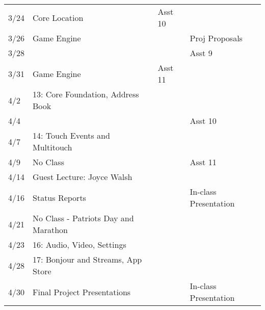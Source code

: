 \documentclass[11pt]{article}
\begin{document}
\begin{centering}
\begin{tabular}{||l|p{3in}|l|l||}
3/24 & Core Location & Asst 10 & \\
3/26 & Game Engine & & Proj Proposals \\
3/28 &&& Asst 9 \\
\hline

3/31 & Game Engine & Asst 11 & \\
4/2 & 13: Core Foundation, Address Book  & & \\
4/4 & & & Asst 10\\

\hline
4/7 & 14: Touch Events and Multitouch  & &\\
4/9 & No Class & &  Asst 11 \\
\hline

4/14 & Guest Lecture: Joyce Walsh & & \\
4/16 & Status Reports  & & In-class Presentation\\
 \hline

4/21 & No Class - Patriots Day and Marathon & & \\
4/23 & 16: Audio, Video, Settings & & \\
\hline
4/28 & 17: Bonjour and Streams, App Store &&\\
4/30 & Final Project Presentations && In-class Presentation\\
\hline\hline

\end{tabular}\\
\end{centering}
\end{document}
